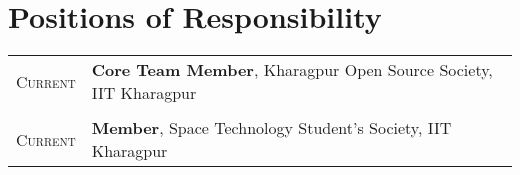 \documentclass[a4paper,12pt]{extarticle} %
\let\oldtextbf\textbf
\renewcommand{\textbf}[1]{\textcolor{bold}{\oldtextbf{#1}}}
\begin{document}


\vspace{-0.3cm}
\section{\textcolor{primary}{Positions of Responsibility}}

\begin{tabular}{r|p{16cm}}
  \textsc{Current} & \textbf{Core Team Member}, Kharagpur Open Source Society, IIT Kharagpur \\
  \multicolumn{2}{c}{} \\


\textsc{Current} & \textbf{Member}, Space Technology Student's Society, IIT Kharagpur \\
\end{tabular}


\end{document}
